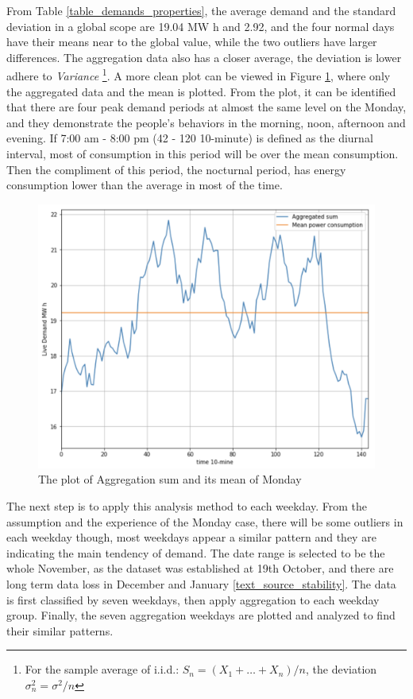 \documentclass[12pt,a4paper]{report}
\begin{document}
                From Table \ref{table_demands_properties}, the average demand and the standard deviation in a global scope are 19.04 MW h and 2.92, and the four normal days have their means near to the global value, while the two outliers have larger differences. The aggregation data also has a closer average, the deviation is lower adhere to \emph{Variance} \footnote{For the sample average of i.i.d.:  $S_n = (X_1 + \dots + X_n)/n$, the deviation \\$\sigma_n^2 = \sigma^2/n$}.
                A more clean plot can be viewed in Figure \ref{plot_monday_agg}, where only the aggregated data and the mean is plotted. From the plot, it can be identified that there are four peak demand periods at almost the same level on the Monday, and they demonstrate the people's behaviors in the morning, noon, afternoon and evening.
                If 7:00 am - 8:00 pm (42 - 120 10-minute) is defined as the diurnal interval, most of consumption in this period will be over the mean consumption. Then the compliment of this period, the nocturnal period, has energy consumption lower than the average in most of the time.
                \begin{figure}[ht]
                    \centerline{\includegraphics[scale=1.2]{monday_agg}}
                    \caption{The plot of Aggregation sum and its mean of Monday}
                    \label{plot_monday_agg}
                \end{figure}

                The next step is to apply this analysis method to each weekday. From the assumption and the experience of the Monday case, there will be some outliers in each weekday though, most weekdays appear a similar pattern and they are indicating the main tendency of demand. The date range is selected to be the whole November, as the dataset was established at 19th October, and there are long term data loss in December and January \ref{text_source_stability}. The data is first classified by seven weekdays, then apply aggregation to each weekday group. Finally, the seven aggregation weekdays are plotted and analyzed to find their similar patterns.
\end{document}

